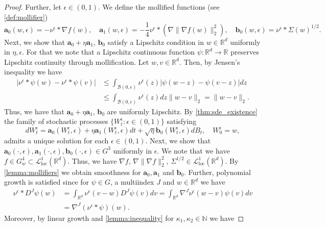 \documentclass[12pt]{article}
\theoremstyle{definition}
\numberwithin{equation}{section}
\newcommand{\N}{\mathbb{N}}
\newcommand{\R}{\mathbb{R}}
\newcommand{\CL}{\mathcal{L}}
\newcommand{\CB}{\mathcal{B}}
\newcommand{\moll}{\nu^{\epsilon}}
\newcommand{\norm}[1]{\lVert{#1}\rVert_2}
\begin{document}
\begin{proof}
  Further, let $\epsilon \in (0,1)$. We define the mollified functions (see \autoref{def:mollifier})
  \begin{equation*}
    \mathbf{a}_0(w, \epsilon) = - \moll * \nabla f(w), \quad \mathbf{a}_1(w, \epsilon) = -\frac{1}{4}\moll * (\nabla\norm{\nabla f(w)}^2), \quad\mathbf{b}_0(w, \epsilon) = \moll * \Sigma(w)^{1/2}.
  \end{equation*}
  Next, we show that $\mathbf{a}_0 + \eta \mathbf{a}_1$, $\mathbf{b}_0$ satisfy a Lipschitz condition in $w \in \R^d$ uniformly in $\eta, \epsilon$.
  For that we note that a Lipschitz continuous function $\psi:\R^d \rightarrow \R$ preserves Lipschitz continuity through mollification. Let $w, v \in \R^d$. Then, by Jensen's inequality we have
  \begin{align*}
    \lvert\moll*\psi(w) - \moll*\psi(v) \rvert &\leq \int_{\CB(0,\epsilon)}\moll(z)\lvert\psi(w-z) - \psi(v-z)\rvert dz \\
    &\leq \int_{\CB(0,\epsilon)}\moll(z)dz \norm{w-v} = \norm{w-v}.
  \end{align*}
  Thus, we have that $\mathbf{a}_0 + \eta \mathbf{a}_1$, $\mathbf{b}_0$ are uniformly Lipschitz. 
  By \autoref{thm:sde_existence} the family of stochastic processes $\{W_t^{\epsilon}: \epsilon \in (0,1)\}$ satisfying 
  \begin{equation*}
    dW_t^{\epsilon} = \mathbf{a}_0(W_t^{\epsilon}, \epsilon) + \eta \mathbf{a}_1(W_t^{\epsilon}, \epsilon)dt + \sqrt{\eta}\mathbf{b}_0(W_t^{\epsilon}, \epsilon)dB_t, \quad W_0^{\epsilon} = w,
  \end{equation*}
  admits a unique solution for each $\epsilon \in (0,1)$.
  Next, we show that $\mathbf{a}_0(\cdot, \epsilon),\mathbf{a}_1(\cdot, \epsilon),\mathbf{b}_0(\cdot, \epsilon) \in G^3$ uniformly in $\epsilon$.
  We note that we have $f \in G^4_w \subset \CL^1_{\text{loc}}(\R^d)$. Thus, we have $\nabla f$, $\nabla \norm{\nabla f}^2$, $\Sigma^{1/2} \in \CL^1_{\text{loc}}(\R^d)$. By \autoref{lemma:mollifiers} we obtain smoothness for $\mathbf{a}_0, \mathbf{a}_1$ and $\mathbf{b}_0$. Further, polynomial growth is satisfied since for $\psi \in G$, a multiindex $J$ and $w \in \R^d$ we have
  \begin{align*}
    \moll * D^J \psi (w) &= \int_{\R^d}\moll(v-w) D^J \psi (v)dv = \int_{\R^d}\nabla^J\moll(w-v)\psi (v) dv \\
    &= \nabla^J(\moll * \psi)(w).
  \end{align*}
  Moreover, by linear growth and \autoref{lemma:inequality} for $\kappa_1, \kappa_2 \in \N$ we have

\end{proof}
\end{document}
